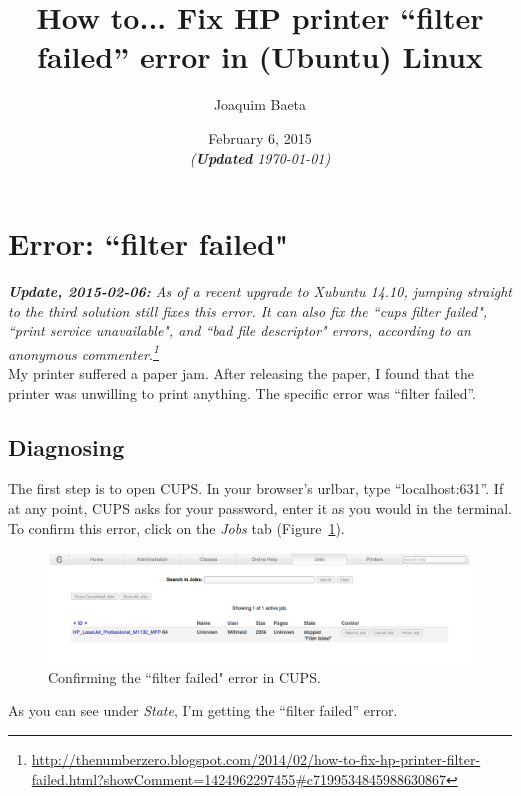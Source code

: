 \documentclass[12pt, a4paper]{article}
\title{\textbf{How to... Fix HP printer “filter failed” error in (Ubuntu) Linux }}
\author{Joaquim Baeta}
\date{February 6, 2015\\ \normalsize \emph{(\textbf{Updated} \today)}}
\begin{document}
\maketitle

\tableofcontents
\vspace{1cm}

\section*{Error: ``filter failed"}

\noindent \emph{\textbf{Update, 2015-02-06:} As of a recent upgrade to Xubuntu 14.10, jumping straight to the third solution still fixes this error. It can also fix the ``cups filter failed", ``print service unavailable", and ``bad file descriptor" errors, according to an anonymous commenter.\footnote{\url{http://thenumberzero.blogspot.com/2014/02/how-to-fix-hp-printer-filter-failed.html?showComment=1424962297455\#c7199534845988630867}}}\\

\noindent My printer suffered a paper jam. After releasing the paper, I found that the printer was unwilling to print anything. The specific error was “filter failed”.

\subsection*{Diagnosing}

The first step is to open CUPS. In your browser's urlbar, type “localhost:631”. If at any point, CUPS asks for your password, enter it as you would in the terminal. To confirm this error, click on the \emph{Jobs} tab (Figure~\ref{fig1}). 

\begin{figure}[h]
  \centering
  \includegraphics[width=1\textwidth]{imgs/filter-failed-1.png}
  \caption{Confirming the ``filter failed" error in CUPS.}
  \label{fig1}
\end{figure}

\noindent As you can see under \emph{State}, I'm getting the “filter failed” error.
\end{document}
